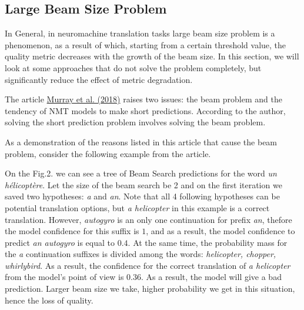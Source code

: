 \documentclass[a4paper,14pt]{extarticle}
\newcommand{\bibref}[3]{\hyperlink{#1}{#2 (#3)}}
\begin{document}
	\subsection{Large Beam Size Problem}
	In General, in neuromachine translation tasks large beam size problem is a phenomenon, as a result of which, starting from a certain threshold value, the quality metric decreases with the growth of the beam size. In this section, we will look at some approaches that do not solve the problem completely, but significantly reduce the effect of metric degradation.
	
	The article \bibref{corr_len_bias}{Murray et al.}{2018} raises two issues: the beam problem and the tendency of NMT models to make short predictions. According to the author, solving the short prediction problem involves solving the beam problem.
	
	As a demonstration of the reasons listed in this article that cause the beam problem, consider the following example from the article.
	
	On the Fig.2. we can see a tree of Beam Search predictions for the word \textit{un hélicoptère}. Let the size of the beam search be 2 and on the first iteration we saved two hypotheses: \textit{a} and \textit{an}. Note that all 4 following hypotheses can be potential translation options, but \textit{a helicopter} in this example is a correct translation. However, \textit{autogyro} is an only one continuation for prefix \textit{an}, thefore the model confidence for this suffix is $1$, and as a result, the model confidence to predict \textit{an autogyro} is equal to $0.4$. At the same time, the probability mass for the \textit{a} continuation suffixes is divided among the words: \textit{helicopter, chopper, whirlybird}. As a result, the confidence for the correct translation of \textit{a helicopter} from the model's point of view is $0.36$. As a result, the model will give a bad prediction. Larger beam size we take, higher probability we get in this situation, hence the loss of quality.
	
	\begin{figure}[t]
	\end{figure}
	
\end{document}
